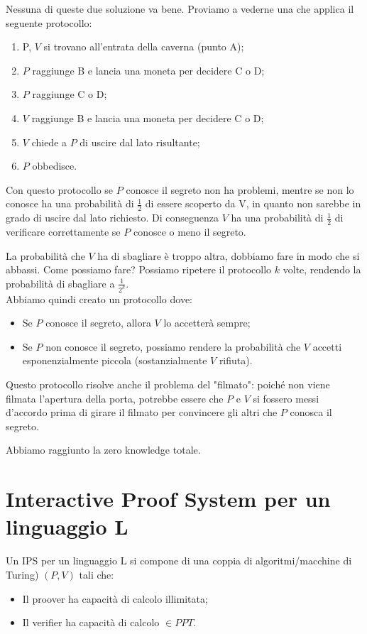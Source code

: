 \noindent Nessuna di queste due soluzione va bene. Proviamo a vederne una che applica il seguente protocollo:
\begin{enumerate}
    \item P, $V$ si trovano all'entrata della caverna (punto A);
    \item $P$ raggiunge B e lancia una moneta per decidere C o D;
    \item $P$ raggiunge C o D;
    \item $V$ raggiunge B e lancia una moneta per decidere C o D;
    \item $V$ chiede a $P$ di uscire dal lato risultante;
    \item $P$ obbedisce.
\end{enumerate}

\noindent Con questo protocollo se $P$ conosce il segreto non ha problemi, mentre se non lo conosce ha una probabilità di $\frac{1}{2}$ di essere scoperto da V, in quanto non sarebbe in grado di uscire dal lato richiesto. Di conseguenza $V$ ha una probabilità di $\frac{1}{2}$ di verificare correttamente se $P$ conosce o meno il segreto.

La probabilità che $V$ ha di sbagliare è troppo altra, dobbiamo fare in modo che si abbassi. Come possiamo fare? Possiamo ripetere il protocollo $k$ volte, rendendo la probabilità di sbagliare a $\frac{1}{2^k}$.
\\

\noindent Abbiamo quindi creato un protocollo dove:
\begin{itemize}
    \item Se $P$ conosce il segreto, allora $V$ lo accetterà sempre;
    \item Se $P$ non conosce il segreto, possiamo rendere la probabilità che $V$ accetti esponenzialmente piccola (sostanzialmente $V$ rifiuta). 
\end{itemize}

\noindent Questo protocollo risolve anche il problema del "filmato": poiché non viene filmata l'apertura della porta, potrebbe essere che $P$ e $V$ si fossero messi d'accordo prima di girare il filmato per convincere gli altri che $P$ conosca il segreto.

Abbiamo raggiunto la zero knowledge totale.

\section{Interactive Proof System per un linguaggio L}
Un IPS per un linguaggio L si compone di una coppia di algoritmi/macchine di Turing) $(P, V)$ tali che:
\begin{itemize}
    \item Il proover ha capacità di calcolo illimitata;
    \item Il verifier ha capacità di calcolo $\in PPT$.
\end{itemize}

